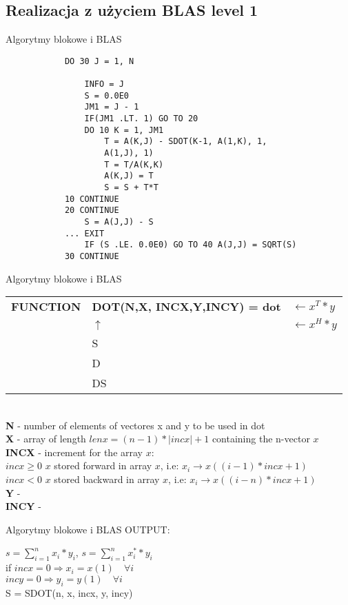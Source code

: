 	\subsection{Realizacja z użyciem BLAS level 1}
	\begin{frame}[fragile]{Algorytmy blokowe i BLAS}
		\begin{lstlisting}
			DO 30 J = 1, N
			
				INFO = J
				S = 0.0E0
				JM1 = J - 1
				IF(JM1 .LT. 1) GO TO 20
				DO 10 K = 1, JM1
					T = A(K,J) - SDOT(K-1, A(1,K), 1,
					A(1,J), 1)
					T = T/A(K,K)
					A(K,J) = T
					S = S + T*T
			10 CONTINUE
			20 CONTINUE
				S = A(J,J) - S
			... EXIT
				IF (S .LE. 0.0E0) GO TO 40 A(J,J) = SQRT(S)
			30 CONTINUE		
		\end{lstlisting}
	\end{frame}
	\begin{frame}{Algorytmy blokowe i BLAS}
		\begin{tabular}{ l l l }
			\textbf{FUNCTION} & \textunderscore \textbf{DOT(N,X, INCX,Y,INCY) = dot} & $ \leftarrow x^T * y $ \\
			   & $\uparrow$ & $ \leftarrow x^H * y $ \\
			   & S &  \\
			   & D & \\
			   & DS & \\
		\end{tabular} \\ 
		\textbf{N} - number of elements of vectores x and y to be used in dot \\
		\textbf{X} - array of length $lenx = (n - 1) * |inc x| + 1$ containing the n-vector $x$ \\
		\textbf{INCX} - increment for the array $x$: \\
		$\textit{incx} \geq 0 $ $x$ stored forward in array $x$, i.e: $x_i \rightarrow x((i - 1) * incx + 1)$ \\
		$\textit{incx} < 0$ $x$ stored backward in array $x$, i.e: $x_i \rightarrow x((i - n) * incx + 1)$ \\
		\textbf{Y} - \\
		\textbf{INCY} - \\
	\end{frame}
	\begin{frame}{Algorytmy blokowe i BLAS}
		OUTPUT: \\
		\begin{center}
			$s = \sum_{i=1}^n x_i * y_i$, $s = \sum_{i=1}^n x_i^{*} * y_i$ \\
			\vspace{5mm}
			if \quad $incx = 0 \Rightarrow x_i = x(1) \quad \forall i$ \\
			\quad $incy = 0 \Rightarrow y_i = y(1) \quad \forall i$ \\
			\vspace{5mm}
			S = SDOT(n, x, incx, y, incy)
		\end{center}
	\end{frame}
